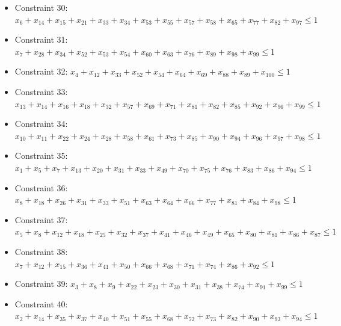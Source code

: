 \documentclass[11pt]{article}
\begin{document}
\begin{itemize}
\item Constraint 30: $x_{6} + x_{14} + x_{15} + x_{21} + x_{33} + x_{34} + x_{53} + x_{55} + x_{57} + x_{58} + x_{65} + x_{77} + x_{82} + x_{97} \le 1$
\item Constraint 31: $x_{7} + x_{28} + x_{34} + x_{52} + x_{53} + x_{54} + x_{60} + x_{63} + x_{76} + x_{89} + x_{98} + x_{99} \le 1$
\item Constraint 32: $x_{4} + x_{12} + x_{33} + x_{52} + x_{54} + x_{64} + x_{69} + x_{88} + x_{89} + x_{100} \le 1$
\item Constraint 33: $x_{13} + x_{14} + x_{16} + x_{18} + x_{32} + x_{57} + x_{69} + x_{71} + x_{81} + x_{82} + x_{85} + x_{92} + x_{96} + x_{99} \le 1$
\item Constraint 34: $x_{10} + x_{11} + x_{22} + x_{24} + x_{28} + x_{58} + x_{61} + x_{73} + x_{85} + x_{90} + x_{94} + x_{96} + x_{97} + x_{98} \le 1$
\item Constraint 35: $x_{1} + x_{5} + x_{7} + x_{13} + x_{20} + x_{31} + x_{33} + x_{49} + x_{70} + x_{75} + x_{76} + x_{83} + x_{86} + x_{94} \le 1$
\item Constraint 36: $x_{8} + x_{18} + x_{26} + x_{31} + x_{33} + x_{51} + x_{63} + x_{64} + x_{66} + x_{77} + x_{81} + x_{84} + x_{98} \le 1$
\item Constraint 37: $x_{5} + x_{8} + x_{12} + x_{18} + x_{25} + x_{32} + x_{37} + x_{41} + x_{46} + x_{49} + x_{65} + x_{80} + x_{81} + x_{86} + x_{87} \le 1$
\item Constraint 38: $x_{7} + x_{12} + x_{15} + x_{36} + x_{41} + x_{50} + x_{66} + x_{68} + x_{71} + x_{74} + x_{86} + x_{92} \le 1$
\item Constraint 39: $x_{3} + x_{8} + x_{9} + x_{22} + x_{23} + x_{30} + x_{31} + x_{38} + x_{74} + x_{91} + x_{99} \le 1$
\item Constraint 40: $x_{2} + x_{14} + x_{35} + x_{37} + x_{40} + x_{51} + x_{55} + x_{68} + x_{72} + x_{73} + x_{82} + x_{90} + x_{93} + x_{94} \le 1$
\end{itemize}
\end{document}
